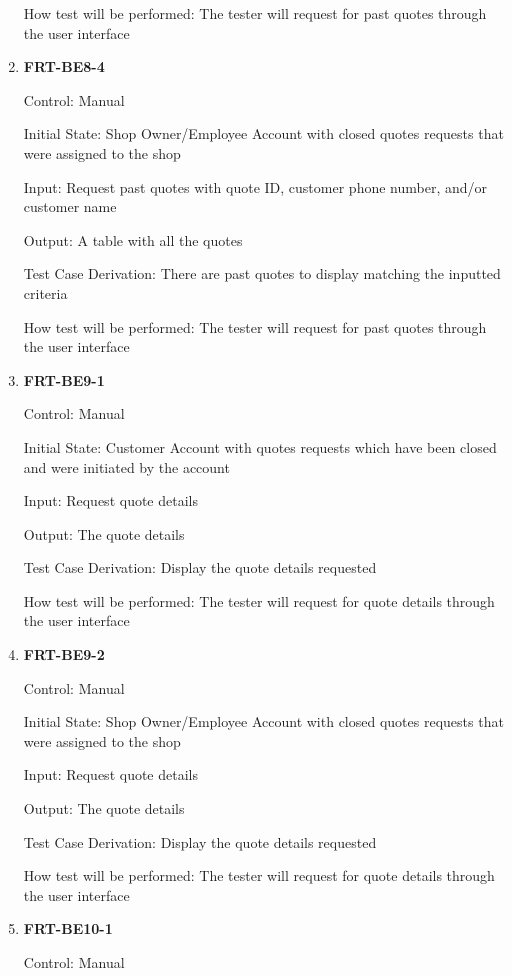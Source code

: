 \documentclass[12pt, titlepage]{article}
\begin{document}
\begin{enumerate}
	      How test will be performed: The tester will request for past quotes through the user interface

	\item \textbf{FRT-BE8-4}

	      Control: Manual

	      Initial State: Shop Owner/Employee Account with closed quotes requests that were assigned to the
	      shop

	      Input: Request past quotes with quote ID, customer phone number, and/or customer name

	      Output: A table with all the quotes

	      Test Case Derivation: There are past quotes to display matching the inputted criteria

	      How test will be performed: The tester will request for past quotes through the user interface

	\item \textbf{FRT-BE9-1}

	      Control: Manual

	      Initial State: Customer Account with quotes requests which have been closed and were initiated by
	      the account

	      Input: Request quote details

	      Output: The quote details

	      Test Case Derivation: Display the quote details requested

	      How test will be performed: The tester will request for quote details through the user interface

	\item \textbf{FRT-BE9-2}

	      Control: Manual

	      Initial State: Shop Owner/Employee Account with closed quotes requests that were assigned to the
	      shop

	      Input: Request quote details

	      Output: The quote details

	      Test Case Derivation: Display the quote details requested

	      How test will be performed: The tester will request for quote details through the user interface

	\item \textbf{FRT-BE10-1}

	      Control: Manual


\end{enumerate}
\end{document}
